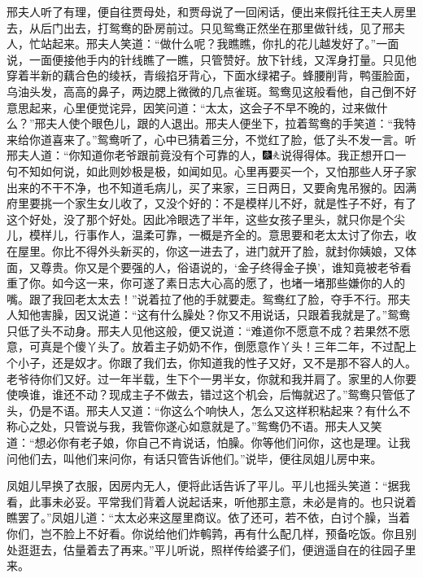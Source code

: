 邢夫人听了有理，便自往贾母处，和贾母说了一回闲话，便出来假托往王夫人房里去，从后门出去，打鸳鸯的卧房前过。只见鸳鸯正然坐在那里做针线，见了邢夫人，忙站起来。邢夫人笑道：“做什么呢？我瞧瞧，你扎的花儿越发好了。”一面说，一面便接他手内的针线瞧了一瞧，只管赞好。放下针线，又浑身打量。只见他穿着半新的藕合色的绫袄，青缎掐牙背心，下面水绿裙子。蜂腰削背，鸭蛋脸面，乌油头发，高高的鼻子，两边腮上微微的几点雀斑。鸳鸯见这般看他，自己倒不好意思起来，心里便觉诧异，因笑问道：“太太，这会子不早不晚的，过来做什么？”邢夫人使个眼色儿，跟的人退出。邢夫人便坐下，拉着鸳鸯的手笑道：“我特来给你道喜来了。”鸳鸯听了，心中已猜着三分，不觉红了脸，低了头不发一言。听邢夫人道：“你知道你老爷跟前竟没有个可靠的人，{\includegraphics[width=3mm]{../Images/00004}\includegraphics[width=3mm]{../Images/00012}\footnotesize \kaishu 说得得体。我正想开口一句不知如何说，如此则妙极是极，如闻如见。}心里再要买一个，又怕那些人牙子家出来的不干不净，也不知道毛病儿，买了来家，三日两日，又要肏鬼吊猴的。因满府里要挑一个家生女儿收了，又没个好的：不是模样儿不好，就是性子不好，有了这个好处，没了那个好处。因此冷眼选了半年，这些女孩子里头，就只你是个尖儿，模样儿，行事作人，温柔可靠，一概是齐全的。意思要和老太太讨了你去，收在屋里。你比不得外头新买的，你这一进去了，进门就开了脸，就封你姨娘，又体面，又尊贵。你又是个要强的人，俗语说的，‘金子终得金子换’，谁知竟被老爷看重了你。如今这一来，你可遂了素日志大心高的愿了，也堵一堵那些嫌你的人的嘴。跟了我回老太太去！”说着拉了他的手就要走。鸳鸯红了脸，夺手不行。邢夫人知他害臊，因又说道：“这有什么臊处？你又不用说话，只跟着我就是了。”鸳鸯只低了头不动身。邢夫人见他这般，便又说道：“难道你不愿意不成？若果然不愿意，可真是个傻丫头了。放着主子奶奶不作，倒愿意作丫头！三年二年，不过配上个小子，还是奴才。你跟了我们去，你知道我的性子又好，又不是那不容人的人。老爷待你们又好。过一年半载，生下个一男半女，你就和我并肩了。家里的人你要使唤谁，谁还不动？现成主子不做去，错过这个机会，后悔就迟了。”鸳鸯只管低了头，仍是不语。邢夫人又道：“你这么个响快人，怎么又这样积粘起来？有什么不称心之处，只管说与我，我管你遂心如意就是了。”鸳鸯仍不语。邢夫人又笑道：“想必你有老子娘，你自己不肯说话，怕臊。你等他们问你，这也是理。让我问他们去，叫他们来问你，有话只管告诉他们。”说毕，便往凤姐儿房中来。

凤姐儿早换了衣服，因房内无人，便将此话告诉了平儿。平儿也摇头笑道：“据我看，此事未必妥。平常我们背着人说起话来，听他那主意，未必是肯的。也只说着瞧罢了。”凤姐儿道：“太太必来这屋里商议。依了还可，若不依，白讨个臊，当着你们，岂不脸上不好看。你说给他们炸鹌鹑，再有什么配几样，预备吃饭。你且别处逛逛去，估量着去了再来。”平儿听说，照样传给婆子们，便逍遥自在的往园子里来。

